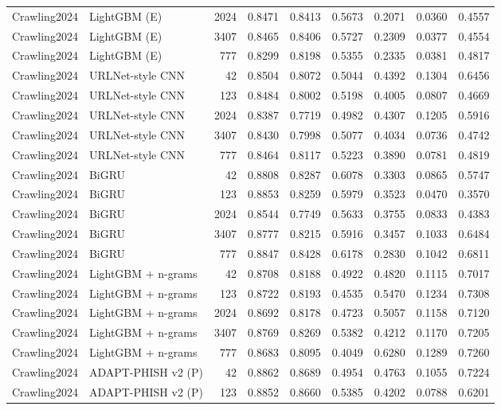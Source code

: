 \begin{table}[t]
\begin{tabular}{llrrrrrrr}
Crawling2024 & LightGBM (E) & 2024 & 0.8471 & 0.8413 & 0.5673 & 0.2071 & 0.0360 & 0.4557 \\
Crawling2024 & LightGBM (E) & 3407 & 0.8465 & 0.8406 & 0.5727 & 0.2309 & 0.0377 & 0.4554 \\
Crawling2024 & LightGBM (E) & 777 & 0.8299 & 0.8198 & 0.5355 & 0.2335 & 0.0381 & 0.4817 \\
Crawling2024 & URLNet-style CNN & 42 & 0.8504 & 0.8072 & 0.5044 & 0.4392 & 0.1304 & 0.6456 \\
Crawling2024 & URLNet-style CNN & 123 & 0.8484 & 0.8002 & 0.5198 & 0.4005 & 0.0807 & 0.4669 \\
Crawling2024 & URLNet-style CNN & 2024 & 0.8387 & 0.7719 & 0.4982 & 0.4307 & 0.1205 & 0.5916 \\
Crawling2024 & URLNet-style CNN & 3407 & 0.8430 & 0.7998 & 0.5077 & 0.4034 & 0.0736 & 0.4742 \\
Crawling2024 & URLNet-style CNN & 777 & 0.8464 & 0.8117 & 0.5223 & 0.3890 & 0.0781 & 0.4819 \\
Crawling2024 & BiGRU & 42 & 0.8808 & 0.8287 & 0.6078 & 0.3303 & 0.0865 & 0.5747 \\
Crawling2024 & BiGRU & 123 & 0.8853 & 0.8259 & 0.5979 & 0.3523 & 0.0470 & 0.3570 \\
Crawling2024 & BiGRU & 2024 & 0.8544 & 0.7749 & 0.5633 & 0.3755 & 0.0833 & 0.4383 \\
Crawling2024 & BiGRU & 3407 & 0.8777 & 0.8215 & 0.5916 & 0.3457 & 0.1033 & 0.6484 \\
Crawling2024 & BiGRU & 777 & 0.8847 & 0.8428 & 0.6178 & 0.2830 & 0.1042 & 0.6811 \\
Crawling2024 & LightGBM + n-grams & 42 & 0.8708 & 0.8188 & 0.4922 & 0.4820 & 0.1115 & 0.7017 \\
Crawling2024 & LightGBM + n-grams & 123 & 0.8722 & 0.8193 & 0.4535 & 0.5470 & 0.1234 & 0.7308 \\
Crawling2024 & LightGBM + n-grams & 2024 & 0.8692 & 0.8178 & 0.4723 & 0.5057 & 0.1158 & 0.7120 \\
Crawling2024 & LightGBM + n-grams & 3407 & 0.8769 & 0.8269 & 0.5382 & 0.4212 & 0.1170 & 0.7205 \\
Crawling2024 & LightGBM + n-grams & 777 & 0.8683 & 0.8095 & 0.4049 & 0.6280 & 0.1289 & 0.7260 \\
Crawling2024 & ADAPT-PHISH v2 (P) & 42 & 0.8862 & 0.8689 & 0.4954 & 0.4763 & 0.1055 & 0.7224 \\
Crawling2024 & ADAPT-PHISH v2 (P) & 123 & 0.8852 & 0.8660 & 0.5385 & 0.4202 & 0.0788 & 0.6201 \\

\end{tabular}
\end{table}
